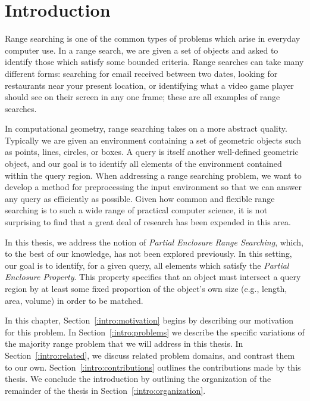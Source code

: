 \chapter{Introduction}
\label{:intro}

Range searching is one of the common types of problems which arise in everyday computer use. 
In a range search, we are given a set of objects and asked to identify those which satisfy some bounded criteria. 
Range searches can take many different forms: searching for email received between two dates, looking for restaurants near your present location, or identifying what a video game player should see on their screen in any one frame; these are all examples of range searches.

In computational geometry, range searching takes on a more abstract quality. 
Typically we are given an environment containing a set of geometric objects such as points, lines, circles, or boxes. 
A query is itself another well-defined geometric object, and our goal is to identify all elements of the environment contained within the query region.  
When addressing a range searching problem, we want to develop a method for preprocessing the input environment so that we can answer any query as efficiently as possible.
Given how common and flexible range searching is to such a wide range of practical computer science, it is not surprising to  find that a great deal of research has been expended in this area.  

In this thesis, we address the notion of \emph{Partial Enclosure Range Searching}, which, to the best of our knowledge, has not been explored previously. 
In this setting, our goal is to identify, for a given query, all elements which satisfy the \emph{Partial Enclosure Property}. 
This property specifies that an object must intersect a query region by at least some fixed proportion of the object's own size (e.g., length, area, volume) in order to be matched.

In this chapter, Section~\ref{:intro:motivation} begins by describing our motivation for this problem. 
In Section~\ref{:intro:problems} we describe the specific variations of the majority range problem that we will address in this thesis. 
In Section~\ref{:intro:related}, we discuss related problem domains, and contrast them to our own.
Section~\ref{:intro:contributions} outlines the contributions made by this thesis.
We conclude the introduction by outlining the organization of the remainder of the thesis in Section~\ref{:intro:organization}.


